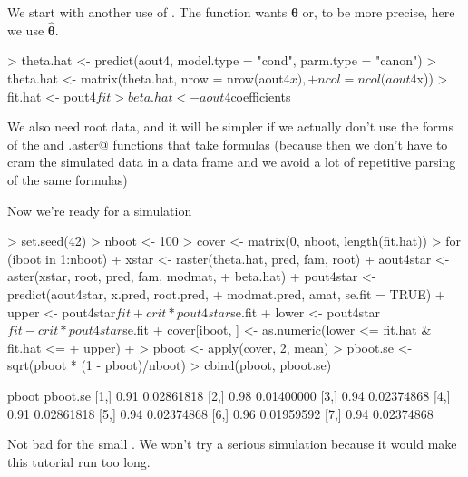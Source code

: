 \documentclass[11pt]{article}
\newcommand{\boldtheta}{{\boldsymbol{\theta}}}
\newcommand{\boldthetahat}{{\boldsymbol{\hat{\theta}}}}
\begin{document}
We start with another use of \verb@predict@.  The \verb@raster@ function
wants $\boldtheta$ or, to be more precise, here we use $\boldthetahat$.
\begin{Schunk}
\begin{Sinput}
> theta.hat <- predict(aout4, model.type = "cond", parm.type = "canon")
> theta.hat <- matrix(theta.hat, nrow = nrow(aout4$x), 
+     ncol = ncol(aout4$x))
> fit.hat <- pout4$fit
> beta.hat <- aout4$coefficients
\end{Sinput}
\end{Schunk}
We also need root data, and it will be simpler if we actually don't
use the forms of the \verb@aster@ and \verb@predict.aster@ functions
that take formulas
(because then we don't have to cram the simulated data in a data frame
and we avoid a lot of repetitive parsing of the same formulas)
\begin{Schunk}
\end{Schunk}
Now we're ready for a simulation
\begin{Schunk}
\begin{Sinput}
> set.seed(42)
> nboot <- 100
> cover <- matrix(0, nboot, length(fit.hat))
> for (iboot in 1:nboot) {
+     xstar <- raster(theta.hat, pred, fam, root)
+     aout4star <- aster(xstar, root, pred, fam, modmat, 
+         beta.hat)
+     pout4star <- predict(aout4star, x.pred, root.pred, 
+         modmat.pred, amat, se.fit = TRUE)
+     upper <- pout4star$fit + crit * pout4star$se.fit
+     lower <- pout4star$fit - crit * pout4star$se.fit
+     cover[iboot, ] <- as.numeric(lower <= fit.hat & fit.hat <= 
+         upper)
+ }
> pboot <- apply(cover, 2, mean)
> pboot.se <- sqrt(pboot * (1 - pboot)/nboot)
> cbind(pboot, pboot.se)
\end{Sinput}
\begin{Soutput}
     pboot   pboot.se
[1,]  0.91 0.02861818
[2,]  0.98 0.01400000
[3,]  0.94 0.02374868
[4,]  0.91 0.02861818
[5,]  0.94 0.02374868
[6,]  0.96 0.01959592
[7,]  0.94 0.02374868
\end{Soutput}
\end{Schunk}

Not bad for the small \verb@nboot@.  We won't try a serious simulation
because it would make this tutorial run too long.
\end{document}
